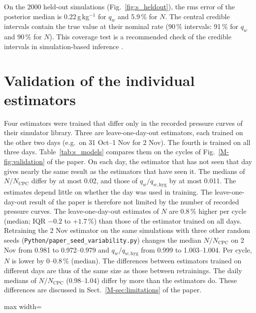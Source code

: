 \documentclass[12pt]{article}
\begin{document}
On the 2000 held-out simulations (Fig.~\ref{fig:s_heldout}), the rms error of the posterior median is
0.22\,g\,kg$^{-1}$ for $q_w$ and 5.9\,\% for $N$.
The central credible intervals contain the true value at their nominal rate (90\,\% intervals:
91\,\% for $q_w$ and 90\,\% for $N$).
This coverage test is a recommended check of the credible intervals in simulation-based inference
\citep{talts2018validating,hermans2022trust}.


\section{Validation of the individual estimators}
\label{sec:s-models}
Four estimators were trained that differ only in the recorded pressure curves of their simulator library.
Three are leave-one-day-out estimators, each trained on the other two days (e.g.\ on 31 Oct--1 Nov for 2
Nov). The fourth is trained on all three days. Table~\ref{tab:s_models} compares them
on the cycles of Fig.~\ref{M-fig:validation}
of the paper. On each day, the estimator that has not seen that day gives nearly the same result as the
estimators that have seen it. The medians of $N/N_\mathrm{CPC}$ differ by at most 0.02, and those of
$q_w/q_{w,\mathrm{hyg}}$ by at most 0.011. The estimates depend little on whether the day was used in
training. The leave-one-day-out result of the paper is therefore not limited by the number of recorded
pressure curves. The leave-one-day-out estimates of $N$ are 0.8\,\% higher per cycle (median; IQR $-0.2$ to
$+1.7$\,\%) than those of the estimator trained on all days.
Retraining the 2 Nov estimator on the same simulations with three other random seeds
(\texttt{Python/\allowbreak paper\_seed\_variability.py}) changes the median $N/N_\mathrm{CPC}$ on 2 Nov
from 0.981 to 0.972--0.979 and $q_w/q_{w,\mathrm{hyg}}$ from 0.999 to 1.003--1.004. Per cycle, $N$
is lower by 0--0.8\,\% (median). The differences between estimators trained on different days are
thus of the same size as those between retrainings. The daily
medians of $N/N_\mathrm{CPC}$ (0.98--1.04) differ by more than the estimators do. These differences are
discussed in Sect.~\ref{M-sec:limitations} of the
paper.

\begin{table}[!htbp]
\centering
\caption{Validation of the individual estimators on each day (same cycles as Fig.~\ref{M-fig:validation}
of the paper). $r$: Pearson's correlation coefficient of $N$ with $N_\mathrm{CPC}$. In 90\,\% CI: percentage
of cycles with $N_\mathrm{CPC}$
inside the 90\,\% credible interval of $N$.}
\label{tab:s_models}
\begin{adjustbox}{max width=\textwidth}\small\end{adjustbox}
\end{table}
\end{document}
